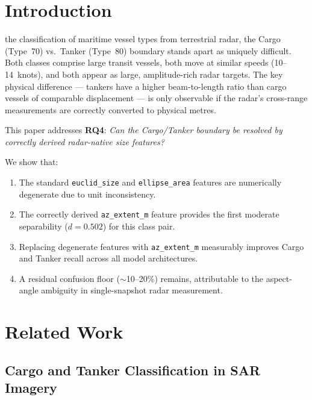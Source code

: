 \documentclass[journal]{IEEEtran}
\begin{document}
\section{Introduction}

 the classification of maritime vessel types from
terrestrial radar, the Cargo (Type~70) vs.\ Tanker (Type~80) boundary stands
apart as uniquely difficult. Both classes comprise large transit vessels, both move at similar
speeds (10--14~knots), and both appear as large, amplitude-rich radar targets.
The key physical difference — tankers have a higher beam-to-length ratio than
cargo vessels of comparable displacement — is only observable if the radar's
cross-range measurements are correctly converted to physical metres.

This paper addresses \textbf{RQ4}: \textit{Can the Cargo/Tanker boundary be
resolved by correctly derived radar-native size features?}

We show that:
\begin{enumerate}
  \item The standard \texttt{euclid\_size} and \texttt{ellipse\_area} features
        are numerically degenerate due to unit inconsistency.
  \item The correctly derived \texttt{az\_extent\_m} feature provides the first
        moderate separability ($d = 0.502$) for this class pair.
  \item Replacing degenerate features with \texttt{az\_extent\_m} measurably
        improves Cargo and Tanker recall across all model architectures.
  \item A residual confusion floor ($\sim$10--20\%) remains, attributable to
        the aspect-angle ambiguity in single-snapshot radar measurement.
\end{enumerate}

\section{Related Work}
\label{sec:relatedwork}

\subsection{Cargo and Tanker Classification in SAR Imagery}
\end{document}
